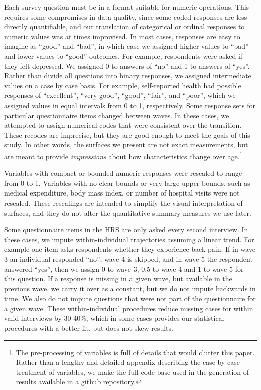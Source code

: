 \documentclass[11pt,oneside,a4paper]{article}
\begin{document}
Each survey question must be in a format suitable for numeric operations.
This requires some compromises in data quality, since some coded responses are less directly
quantifiable, and our translation of categorical or ordinal responses to numeric
values was at times improvised. In most cases, responses are easy to imagine as
``good'' and ``bad'', in which case we assigned higher values to ``bad'' and
lower values to ``good'' outcomes. For example, respondents were asked if they
felt depressed. We assigned 0 to answers of ``no'' and 1 to answers of ``yes''.
Rather than divide all questions into binary responses, we assigned intermediate
values on a case by case basis. For example, self-reported health
had possible responses of ``excellent'', ``very good'', ``good'',
``fair'', and ``poor'', which we assigned values in equal intervals
from 0 to 1, respectively. Some response
sets for particular questionnaire items changed between
waves.
In these cases, we attempted to assign numerical codes that were consistent
over the transition. These recodes are imprecise, but they are good enough
to meet the goals of this study. In other words, the surfaces we
present are not exact measurements, but are meant to provide
\textit{impressions} about how characteristics change over age.\footnote{The pre-processing of variables is full of details that would clutter this paper. Rather than a lengthy and detailed appendix describing the case by case treatment of variables, we make the full code base used in the generation of results available in a github repository.}

Variables with compact or bounded numeric responses were rescaled to range from
0 to 1. Variables with no clear bounds or very large upper
bounds, such as medical expenditure, body mass index, or number of hospital
visits were not rescaled. These rescalings are intended to simplify
the visual interpretation of surfaces, and they do not alter the
quantitative summary measures we use later. 

Some questionnaire items in the HRS are only asked every second interview. In
these cases, we impute within-individual trajectories assuming a linear
trend. For example one item asks respondents whether they experience back
pain. If in wave 3 an individual responded ``no'', wave 4 is skipped, and in
wave 5 the respondent answered ``yes'', then we assign 0 to wave 3, 0.5 to wave
4 and 1 to wave 5 for this question. If a response is missing in a given wave,
but available in the previous wave, we carry it over as a constant, but we do
not impute backwards in time. We also do not impute questions that were not part
of the questionnaire for a given wave. These within-individual procedures reduce
missing cases for within valid interviews by 30-40\%, which in some cases provides our statistical
procedures with a better fit, but does not skew results.
\end{document}
